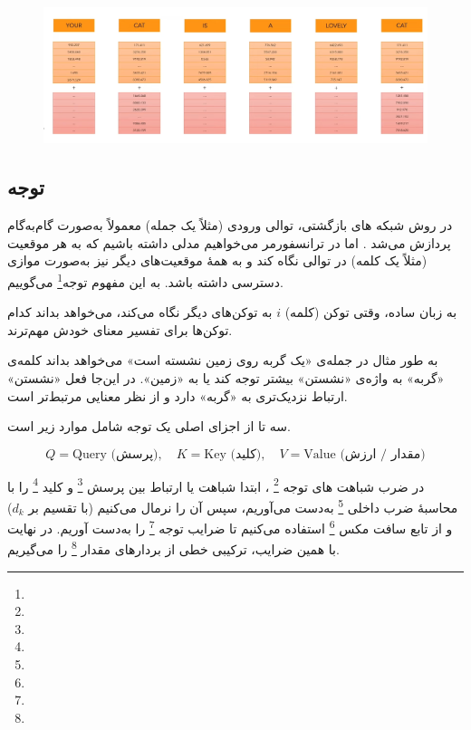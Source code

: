 \begin{figure}[h]
	\centering
	\begin{minipage}[b]{0.7\textwidth}
		\centering
		\includegraphics[width=\textwidth]{transformer_images/positional_embedding.png}
		\caption{}
		\label{fig:word_embedding_positional_embedding}
	\end{minipage}
	\hfill
\end{figure}






\subsection{توجه}



در روش‌ شبکه های بازگشتی، توالی ورودی (مثلاً یک جمله) معمولاً به‌صورت گام‌به‌گام پردازش می‌شد \cite{elman1990finding,hochreiter1997long}. اما در ترانسفورمر می‌خواهیم مدلی داشته باشیم که به هر موقعیت (مثلاً یک کلمه) در توالی نگاه کند و به همهٔ موقعیت‌های دیگر نیز به‌صورت موازی دسترسی داشته باشد. به این مفهوم توجه\footnote{} می‌گوییم.

به زبان ساده، وقتی توکن (کلمه) \( i \) به توکن‌های دیگر نگاه می‌کند، می‌خواهد بداند کدام توکن‌ها برای تفسیر معنای خودش مهم‌ترند.

به طور مثال در جمله‌ی «یک گربه روی زمین نشسته است» می‌خواهد بداند کلمه‌ی «گربه» به واژه‌ی «نشستن» بیشتر توجه کند یا به «زمین». در این‌جا فعل «نشستن» ارتباط نزدیک‌تری به «گربه» دارد و از نظر معنایی مرتبط‌تر است.


سه تا از اجزای اصلی یک توجه شامل موارد زیر است.

\[
Q = \text{Query (پرسش)}, \quad K = \text{Key (کلید)}, \quad V = \text{Value (مقدار / ارزش)}
\]





در  ضرب شباهت های توجه \footnote{}    \cite{vaswani2017attention}، ابتدا شباهت یا ارتباط بین پرسش \footnote{} و کلید \footnote{} را با محاسبهٔ ضرب داخلی \footnote{} به‌دست می‌آوریم، سپس آن را نرمال می‌کنیم (با تقسیم بر \( d_k \)) و از تابع سافت مکس \footnote{} استفاده می‌کنیم تا ضرایب توجه \footnote{} را به‌دست آوریم. در نهایت با همین ضرایب، ترکیبی خطی از بردارهای مقدار \footnote{} را می‌گیریم.

